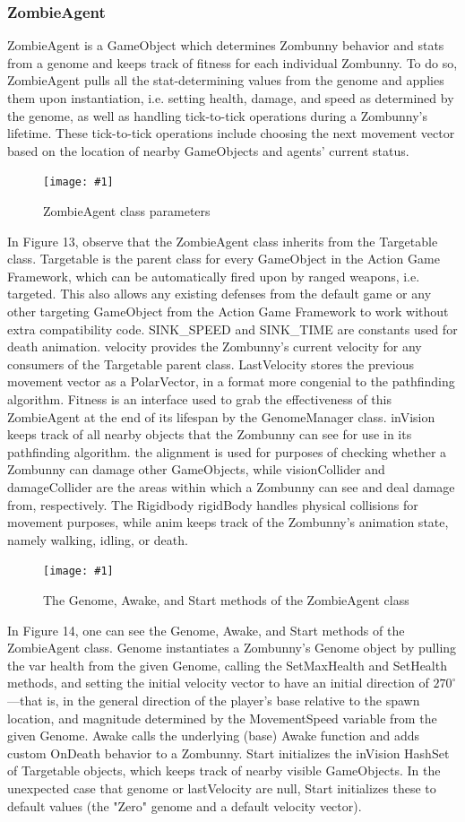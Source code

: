 \documentclass[letterpaper]{article}
\def\imfig#1#2{\begin{figure}[h] \centering \texttt{[image: \#1]} \caption{#2} \end{figure}}
\def\imfigH#1#2{\begin{figure}[H] \centering \texttt{[image: \#1]} \caption{#2} \end{figure}}
\begin{document}
\subsubsection{ZombieAgent}

ZombieAgent is a GameObject which determines Zombunny behavior and stats from a genome and keeps track of fitness for each individual Zombunny. To do so, ZombieAgent pulls all the stat-determining values from the genome and applies them upon instantiation, i.e. setting health, damage, and speed as determined by the genome, as well as handling tick-to-tick operations during a Zombunny's lifetime. These tick-to-tick operations include choosing the next movement vector based on the location of nearby GameObjects and agents' current status.

\imfigH{ZombieAgent1}{ZombieAgent class parameters}

In Figure 13, observe that the ZombieAgent class inherits from the Targetable class. Targetable is the parent class for every GameObject in the Action Game Framework, which can be automatically fired upon by ranged weapons, i.e. targeted. This also allows any existing defenses from the default game or any other targeting GameObject from the Action Game Framework to work without extra compatibility code. SINK\_SPEED and SINK\_TIME are constants used for death animation. velocity provides the Zombunny's current velocity for any consumers of the Targetable parent class. LastVelocity stores the previous movement vector as a PolarVector, in a format more congenial to the pathfinding algorithm. Fitness is an interface used to grab the effectiveness of this ZombieAgent at the end of its lifespan by the GenomeManager class. inVision keeps track of all nearby objects that the Zombunny can see for use in its pathfinding algorithm. the alignment is used for purposes of checking whether a Zombunny can damage other GameObjects, while visionCollider and damageCollider are the areas within which a Zombunny can see and deal damage from, respectively. The Rigidbody rigidBody handles physical collisions for movement purposes, while anim keeps track of the Zombunny's animation state, namely walking, idling, or death.

\imfig{ZombieAgentInit}{The Genome, Awake, and Start methods of the ZombieAgent class}

In Figure 14, one can see the Genome, Awake, and Start methods of the
ZombieAgent class. Genome instantiates a Zombunny's Genome object by pulling the
var health from the given Genome, calling the SetMaxHealth and SetHealth
methods, and setting the initial velocity vector to have an initial direction of
$270^\circ$\----that is, in the general direction of the player's base relative
to the spawn location, and magnitude determined by the MovementSpeed variable
from the given Genome. Awake calls the underlying (base) Awake function and adds
custom OnDeath behavior to a Zombunny. Start initializes the inVision HashSet of
Targetable objects, which keeps track of nearby visible GameObjects. In the
unexpected case that genome or lastVelocity are null, Start initializes these to
default values (the "Zero" genome and a default velocity vector).
\end{document}
